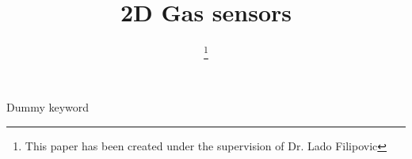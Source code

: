 \documentclass[conference]{IEEEtran}
\begin{document}
\title{2D Gas sensors}

\author{
\thanks{This paper has been created under the supervision of Dr. Lado Filipovic}
}

\maketitle




\begin{IEEEkeywords}
Dummy keyword
\end{IEEEkeywords}







\printglossary
\end{document}
